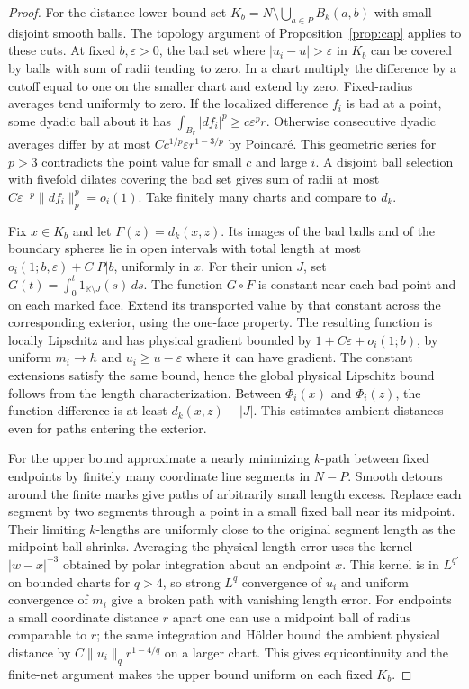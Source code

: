 \documentclass[11pt]{article}
\theoremstyle{definition}
\theoremstyle{remark}
\begin{document}
\begin{proof}
For the distance lower bound set \(K_b=N\setminus\bigcup_{a\in P}B_k(a,b)\) with small disjoint smooth balls. The topology argument of Proposition~\ref{prop:cap} applies to these cuts. At fixed \(b,\varepsilon>0\), the bad set where \(|u_i-u|>\varepsilon\) in \(K_b\) can be covered by balls with sum of radii tending to zero. In a chart multiply the difference by a cutoff equal to one on the smaller chart and extend by zero. Fixed-radius averages tend uniformly to zero. If the localized difference \(f_i\) is bad at a point, some dyadic ball about it has \(\int_{B_r}|df_i|^p\ge c\varepsilon^p r\). Otherwise consecutive dyadic averages differ by at most \(C c^{1/p}\varepsilon r^{1-3/p}\) by Poincar\'e. This geometric series for \(p>3\) contradicts the point value for small \(c\) and large \(i\). A disjoint ball selection with fivefold dilates covering the bad set gives sum of radii at most \(C\varepsilon^{-p}\|df_i\|_p^p=o_i(1)\). Take finitely many charts and compare to \(d_k\).

Fix \(x\in K_b\) and let \(F(z)=d_k(x,z)\). Its images of the bad balls and of the boundary spheres lie in open intervals with total length at most \(o_i(1;b,\varepsilon)+C|P|b\), uniformly in \(x\). For their union \(J\), set \(G(t)=\int_0^t 1_{\mathbb R\setminus J}(s)\,ds\). The function \(G\circ F\) is constant near each bad point and on each marked face. Extend its transported value by that constant across the corresponding exterior, using the one-face property. The resulting function is locally Lipschitz and has physical gradient bounded by \(1+C\varepsilon+o_i(1;b)\), by uniform \(m_i\to h\) and \(u_i\ge u-\varepsilon\) where it can have gradient. The constant extensions satisfy the same bound, hence the global physical Lipschitz bound follows from the length characterization. Between \(\Phi_i(x)\) and \(\Phi_i(z)\), the function difference is at least \(d_k(x,z)-|J|\). This estimates ambient distances even for paths entering the exterior.

For the upper bound approximate a nearly minimizing \(k\)-path between fixed endpoints by finitely many coordinate line segments in \(N-P\). Smooth detours around the finite marks give paths of arbitrarily small length excess. Replace each segment by two segments through a point in a small fixed ball near its midpoint. Their limiting \(k\)-lengths are uniformly close to the original segment length as the midpoint ball shrinks. Averaging the physical length error uses the kernel \(|w-x|^{-3}\) obtained by polar integration about an endpoint \(x\). This kernel is in \(L^{q'}\) on bounded charts for \(q>4\), so strong \(L^q\) convergence of \(u_i\) and uniform convergence of \(m_i\) give a broken path with vanishing length error. For endpoints a small coordinate distance \(r\) apart one can use a midpoint ball of radius comparable to \(r\); the same integration and H\"older bound the ambient physical distance by \(C\|u_i\|_q r^{1-4/q}\) on a larger chart. This gives equicontinuity and the finite-net argument makes the upper bound uniform on each fixed \(K_b\).


\end{proof}
\end{document}
